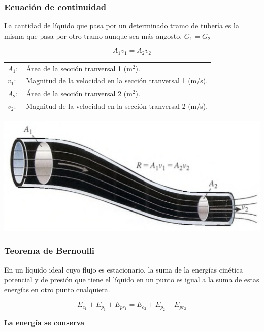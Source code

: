 \documentclass[handout]{beamer}
\begin{document}
\begin{frame}[allowframebreaks,t]
  \frametitle{Ecuación de continuidad}
  \begin{block}{}
    La cantidad de líquido que pasa por un determinado tramo de tubería es la misma que
    pasa por otro tramo aunque sea más angosto. $G_{1} = G_{2}$
  \end{block}

  {\huge \[A_{1}v_{1} = A_{2}v_{2}\]}
  
  \begin{tabular}{ll}
    $A_{1}:$ & Área de la sección tranversal 1 (m$^2$).  \\ 
    $v_{1}:$ & Magnitud de la velocidad en la sección tranversal 1 (m/s). \\ 
    $A_{2}:$ & Área de la sección tranversal 2 (m$^2$).  \\ 
    $v_{2}:$ & Magnitud de la velocidad en la sección tranversal 2 (m/s). \\ 
  \end{tabular}
  \begin{center}
    \includegraphics[scale=0.4]{continuidad2}
  \end{center}
\end{frame}


\begin{frame}
  \frametitle{Teorema de Bernoulli}
  \begin{block}{}
    En un líquido ideal cuyo flujo es estacionario, la suma de la energías cinética
    potencial y de presión que tiene el líquido en un punto es igual a la suma de estas
    energías en otro punto cualquiera.\\
  \end{block}
  \[
  E_{c_1} + E_{p_1} + E_{pr_1} =  E_{c_2} + E_{p_2} + E_{pr_2}
  \]
  \begin{center}
    {\huge \textbf{La energía se conserva}}
  \end{center}
\end{frame}
\end{document}
